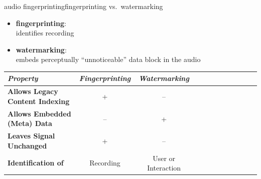         \begin{frame}{audio fingerprinting}{fingerprinting vs.\ watermarking}
            \begin{itemize}
                \item	\textbf{fingerprinting}:\\ identifies recording
                \item	\textbf{watermarking}:\\ embeds perceptually ``unnoticeable'' data block in the audio
            \end{itemize}
            \pause
            \begin{footnotesize}
                \begin{table}
                    \centering
                    \begin{tabular}{lccccccccccc} %
                        \\ \hline
                        \bf{\emph{Property}}	 & \bf{\emph{Fingerprinting}}	 & \bf{\emph{Watermarking}}\\ 
                         \hline
                        \bf{Allows Legacy Content Indexing}	 & +	 & --\\
                        \bf{Allows Embedded (Meta) Data}	 & --	 & +\\
                        \bf{Leaves Signal Unchanged}	 & +	 & --\\
                        \bf{Identification of}	 & Recording	 & User or Interaction\\
                    \end{tabular}
                \end{table}
            \end{footnotesize}
        \end{frame}

